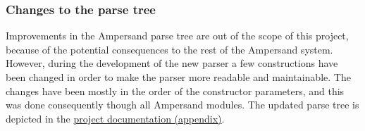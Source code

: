 \subsubsection{Changes to the parse tree}
\label{design:parse-tree}
Improvements in the Ampersand parse tree are out of the scope of this project, because of the potential consequences to the rest of the Ampersand system.
However, during the development of the new parser a few constructions have been changed in order to make the parser more readable and maintainable.
The changes have been mostly in the order of the constructor parameters, and this was done consequently though all Ampersand modules.
The updated parse tree is depicted in the \hyperref[app:docs]{project documentation (appendix)}.
